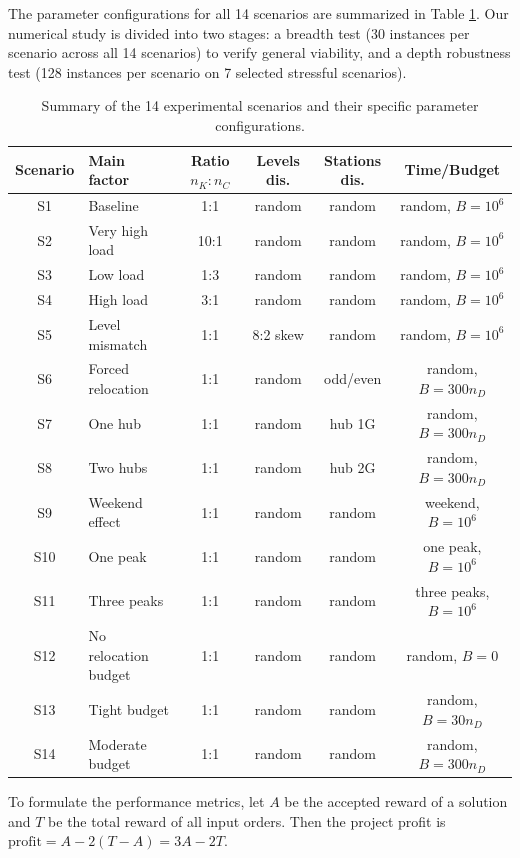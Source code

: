 \documentclass[10pt,a4paper]{article}
\begin{document}
The parameter configurations for all 14 scenarios are summarized in Table \ref{tab:scenarios}. Our numerical study is divided into two stages: a breadth test (30 instances per scenario across all 14 scenarios) to verify general viability, and a depth robustness test (128 instances per scenario on 7 selected stressful scenarios).

\begin{table}[htbp]
\centering
\small
\caption{Summary of the 14 experimental scenarios and their specific parameter configurations.}
\label{tab:scenarios}
\begin{tabular}{clcccc}
\toprule
Scenario & Main factor & Ratio $n_K:n_C$ & Levels dis. & Stations dis. & Time/Budget \\
\midrule
S1 & Baseline & 1:1 & random & random & random, $B=10^6$\\
S2 & Very high load & 10:1 & random & random & random, $B=10^6$\\
S3 & Low load & 1:3 & random & random & random, $B=10^6$\\
S4 & High load & 3:1 & random & random & random, $B=10^6$\\
S5 & Level mismatch & 1:1 & 8:2 skew & random & random, $B=10^6$\\
S6 & Forced relocation & 1:1 & random & odd/even & random, $B=300n_D$\\
S7 & One hub & 1:1 & random & hub 1G & random, $B=300n_D$\\
S8 & Two hubs & 1:1 & random & hub 2G & random, $B=300n_D$\\
S9 & Weekend effect & 1:1 & random & random & weekend, $B=10^6$\\
S10 & One peak & 1:1 & random & random & one peak, $B=10^6$\\
S11 & Three peaks & 1:1 & random & random & three peaks, $B=10^6$\\
S12 & No relocation budget & 1:1 & random & random & random, $B=0$\\
S13 & Tight budget & 1:1 & random & random & random, $B=30n_D$\\
S14 & Moderate budget & 1:1 & random & random & random, $B=300n_D$\\
\bottomrule
\end{tabular}
\end{table}

To formulate the performance metrics, let $A$ be the accepted reward of a solution and $T$ be the total reward of all input orders. Then the project profit is
$\text{profit}=A-2(T-A)=3A-2T$.
\end{document}
